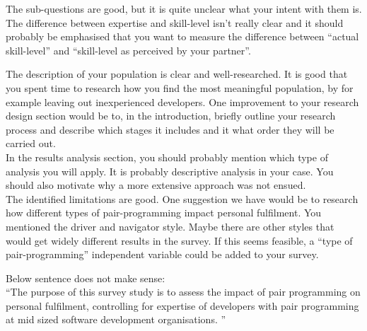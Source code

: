 \documentclass[times, 10pt,twocolumn]{IEEEtran}
\begin{document}
The sub-questions are good, but it is quite unclear what your intent with them is. The difference between expertise and skill-level isn't really clear and it should probably be emphasised that you want to measure the difference between ``actual skill-level'' and ``skill-level as perceived by your partner''. 


The description of your population is clear and well-researched. It is good that you spent time to research how you find the most meaningful population, by for example leaving out inexperienced developers. One improvement to your research design section would be to, in the introduction, briefly outline your research process and describe which stages it includes and it what order they will be carried out. 
\\

In the results analysis section, you should probably mention which type of analysis you will apply. It is probably descriptive analysis in your case. You should also motivate why a more extensive approach was not ensued. 
\\

The identified limitations are good. One suggestion we have would be to research how different types of pair-programming impact personal fulfilment. You mentioned the driver and navigator style. Maybe there are other styles that would get widely different results in the survey. If this seems feasible, a ``type of pair-programming'' independent variable could be added to your survey. 


Below sentence does not make sense: \\
``The purpose of this survey study is to assess the impact of pair programming on personal fulfilment, controlling for expertise of developers with pair programming at mid sized software development organisations. ''
\end{document}
